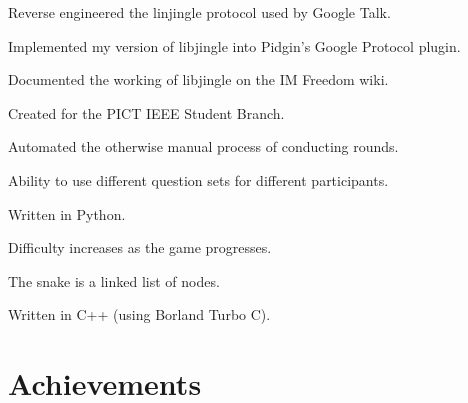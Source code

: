 \documentclass[letterpaper]{deedy-resume} %
\begin{document}
\begin{minipage}[t]{0.66\textwidth}

\begin{tightitemize}
\item Reverse engineered the linjingle protocol used by Google Talk.
\item Implemented my version of libjingle into Pidgin's Google Protocol plugin.
\item Documented the working of libjingle on the IM Freedom wiki.
\end{tightitemize}

\sectionspace %



\begin{tightitemize}
\item Created for the PICT IEEE Student Branch.
\item Automated the otherwise manual process of conducting rounds.
\item Ability to use different question sets for different participants.
\item Written in Python.
\end{tightitemize}

\sectionspace %



\begin{tightitemize}
\item Difficulty increases as the game progresses.
\item The snake is a linked list of nodes.
\item Written in C++ (using Borland Turbo C).
\end{tightitemize}

\sectionspace %


\section{Achievements}


\end{minipage}
\end{document}
